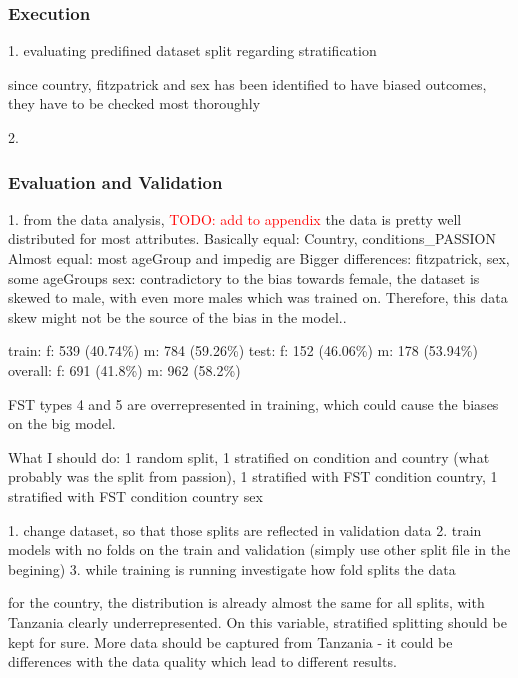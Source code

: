 \documentclass[12pt, a4paper, oneside]{book}   	%
\renewcommand{\todo}[1]{\textcolor{red}{TODO: #1}}
\renewcommand{\paragraph}[1]{%
	\subsubsection*{#1}%
}
\newif\ifrawcitationactive
\newcommand{\rawcitationend}{
	\color{black}\rawcitationactivefalse
}
\begin{document}
		\rawcitationend
		
		
		
		\paragraph{Execution}
		1. evaluating predifined dataset split regarding stratification
		
		
			
		since country, fitzpatrick and sex has been identified to have biased outcomes, they have to be checked most thoroughly 
		
		2. 
		
		\paragraph{Evaluation and Validation}
		1. from the data analysis, \todo{add to appendix} the data is pretty well distributed for most attributes. %
		Basically equal: Country, conditions\_PASSION
		Almost equal: most ageGroup and impedig are 
		Bigger differences: fitzpatrick, sex, some ageGroups
		sex: contradictory to the bias towards female, the dataset is skewed to male, with even more males which was trained on. Therefore, this data skew might not be the source of the bias in the model.. 
		
		train: f: 539 (40.74\%) m: 784 (59.26\%)
		test: f: 152 (46.06\%) m: 178 (53.94\%)
		overall: f: 691 (41.8\%) m: 962 (58.2\%)
		
		
		FST types 4 and 5 are overrepresented in training, which could cause the biases on the big model.
		
		
		What I should do:
		1 random split, 1 stratified on condition and country (what probably was the split from passion), 1 stratified with FST condition country, 1 stratified with FST condition country sex 
		
		
		1. change dataset, so that those splits are reflected in validation data
		2. train models with no folds on the train and validation (simply use other split file in the begining)
		3. while training is running investigate how fold splits the data
		
		
		
	
		for the country, the distribution is already almost the same for all splits, with Tanzania clearly underrepresented. On this variable, stratified splitting should be kept for sure. More data should be captured from Tanzania - it could be differences with the data quality which lead to different results.
		
\end{document}
